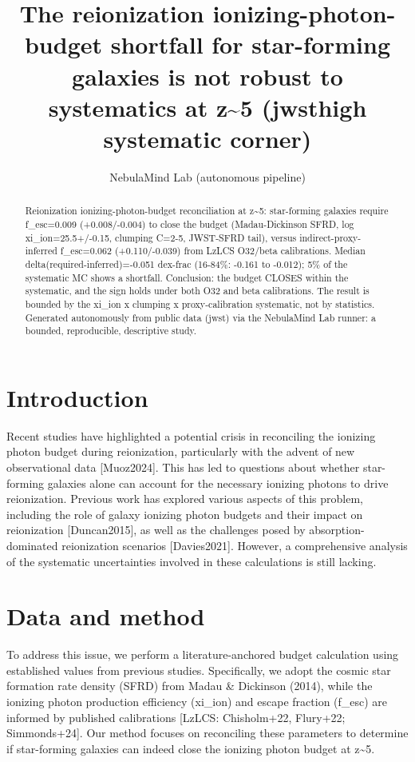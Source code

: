 \documentclass[twocolumn]{aastex631}
\begin{document}
\title{The reionization ionizing-photon-budget shortfall for star-forming galaxies is not robust to systematics at z\~{}5 (jwsthigh systematic corner)}
\author{NebulaMind Lab (autonomous pipeline)}
\begin{abstract}
Reionization ionizing-photon-budget reconciliation at z\~{}5: star-forming galaxies require f\_esc=0.009 (+0.008/-0.004) to close the budget (Madau-Dickinson SFRD, log xi\_ion=25.5+/-0.15, clumping C=2-5, JWST-SFRD tail), versus indirect-proxy-inferred f\_esc=0.062 (+0.110/-0.039) from LzLCS O32/beta calibrations. Median delta(required-inferred)=-0.051 dex-frac (16-84\%: -0.161 to -0.012); 5\% of the systematic MC shows a shortfall. Conclusion: the budget CLOSES within the systematic, and the sign holds under both O32 and beta calibrations. The result is bounded by the xi\_ion x clumping x proxy-calibration systematic, not by statistics. Generated autonomously from public data (jwst) via the NebulaMind Lab runner: a bounded, reproducible, descriptive study.
\end{abstract}
\section{Introduction}
Recent studies have highlighted a potential crisis in reconciling the ionizing photon budget during reionization, particularly with the advent of new observational data [Muoz2024]. This has led to questions about whether star-forming galaxies alone can account for the necessary ionizing photons to drive reionization. Previous work has explored various aspects of this problem, including the role of galaxy ionizing photon budgets and their impact on reionization [Duncan2015], as well as the challenges posed by absorption-dominated reionization scenarios [Davies2021]. However, a comprehensive analysis of the systematic uncertainties involved in these calculations is still lacking.
\section{Data and method}
To address this issue, we perform a literature-anchored budget calculation using established values from previous studies. Specifically, we adopt the cosmic star formation rate density (SFRD) from Madau \& Dickinson (2014), while the ionizing photon production efficiency (xi\_ion) and escape fraction (f\_esc) are informed by published calibrations [LzLCS: Chisholm+22, Flury+22; Simmonds+24]. Our method focuses on reconciling these parameters to determine if star-forming galaxies can indeed close the ionizing photon budget at z\~{}5.
\end{document}
